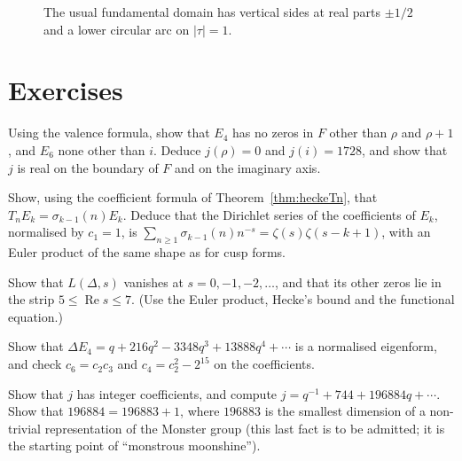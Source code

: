 \begin{figure}[ht]
\centering
{}
\caption{The usual fundamental domain has vertical sides at real parts $\pm1/2$ and a lower circular arc on $|\tau|=1$.}
\label{fig:v13-extra-17-b}
\end{figure}

\section{Exercises}

\begin{exercise}[$\star$]\label{ex:jvalues}
Using the valence formula, show that $E_4$ has no zeros in $F$ other than $\rho$ and $\rho+1$, and $E_6$ none other than $i$. Deduce $j(\rho)=0$ and $j(i)=1728$, and show
that $j$ is real on the boundary of $F$ and on the imaginary axis.
\end{exercise}

\begin{exercise}[$\star$]\label{ex:eisenhecke}
Show, using the coefficient formula of Theorem~\ref{thm:heckeTn}, that $T_nE_k=\sigma_{k-1}(n)E_k$. Deduce that the Dirichlet series of the coefficients of
$E_k$, normalised by $c_1=1$, is $\sum_{n\ge1}\sigma_{k-1}(n)n^{-s}=\zeta(s)\zeta(s-k+1)$, with an Euler product of the same shape as for cusp forms.
\end{exercise}

\begin{exercise}[$\star$]\label{ex:trivialzeros}
Show that $L(\Delta,s)$ vanishes at $s=0,-1,-2,\dots$, and that its other zeros lie in the strip $5\le\operatorname{Re}s\le7$. (Use the
Euler product, Hecke's bound and the functional equation.)
\end{exercise}

\begin{exercise}[$\star\star$]\label{ex:deltae4}
Show that $\Delta E_4=q+216q^2-3348q^3+13888q^4+\cdots$ is a normalised eigenform, and check $c_6=c_2c_3$ and $c_4=c_2^2-2^{15}$ on the coefficients.
\end{exercise}

\begin{exercise}[$\star\star$]\label{ex:jint}
Show that $j$ has integer coefficients, and compute $j=q^{-1}+744+196884q+\cdots$. Show that $196884=196883+1$, where $196883$ is the smallest dimension of a non-trivial
representation of the Monster group (this last fact is to be admitted; it is the starting point of ``monstrous moonshine'').
\end{exercise}

